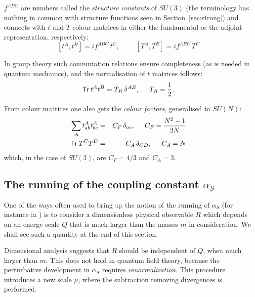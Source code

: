 $f^{ABC}$ are numbers called the \emph{structure constants} of $SU(3)$ (the
terminology has nothing in common with structure functions seen in
Section~\ref{sec:strong}) and connects with $t$ and $T$ colour matrices in either the fundamental or
the adjoint representation, respectively:
\begin{equation}
\left[ t^{A}, t^{B}\right] = i f^{ABC}\,t^{C}, \hspace{1cm} \left[ T^{A}, T^{B}\right] = i f^{ABC}\,T^{C}
\end{equation}

In group theory such commutation relations ensure completeness (as is needed in quantum mechanics), and the normalisation of $t$
matrices follows:
\begin{equation}
\mathsf{Tr}\: t^{A}t^{B} = T_{R}\: \delta^{AB}, \hspace{0.5cm} T_{R} = \frac{1}{2}.
\end{equation}

From colour matrices one also gets the \emph{colour factors}, generalised to
$SU(N)$:
\begin{eqnarray}
\displaystyle\sum_{A}t_{ab}^{A}t_{bc}^{A} &=&
C_{F}\,\delta_{ac},\hspace{0.5cm} C_{F} = \frac{N^{2}-1}{2N}\\
\mathsf{Tr}\: T^{C}T^{D} &=& C_{A}\,\delta_{CD},\hspace{0.5cm} C_{A}=N
\end{eqnarray}
which, in the case of $SU(3)$, are $C_{F}=4/3$ and $C_A = 3$.

\subsection{The running of the coupling constant
  \texorpdfstring{$\alpha_{S}$}{as}}
\label{sec:running}
One of the ways often used to bring up the notion of the running of
$\alpha_{S}$ (for instance in \cite{webber1}) is to consider a dimensionless physical observable $R$ which depends on an energy scale $Q$ that is much larger than the masses $m$ in consideration. We shall see such a quantity at the end of this section. 

Dimensional analysis suggests that $R$ should be independent of $Q$, when much larger than $m$. This does not hold in quantum field theory, because the perturbative development in $\alpha_S$ requires \emph{renormalization}. This procedure introduces a new scale $\mu$, where the subtraction removing divergences is performed. 

